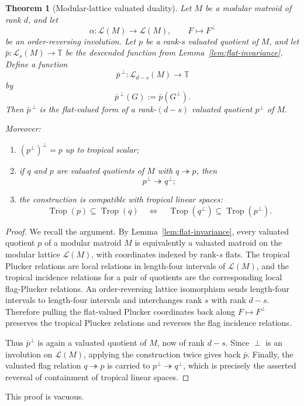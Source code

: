\documentclass[12pt]{article}
\newcommand{\Trop}{\operatorname{Trop}}
\newcommand{\cL}{\mathcal L}
\theoremstyle{plain}
\newtheorem{theorem}{Theorem}[section]
\theoremstyle{definition}
\newcommand{\review}[1]{\begin{reviewbox}#1\end{reviewbox}}
\begin{document}
\begin{theorem}[Modular-lattice valuated duality]\label{thm:modular-duality}
Let \(M\) be a modular matroid of rank \(d\), and let
\[
   \alpha:\cL(M)\longrightarrow \cL(M),\qquad F\longmapsto F^\perp
\]
be an order-reversing involution.  Let \(p\) be a rank-\(s\) valuated quotient of \(M\), and let \(\bar p:\cL_s(M)\to \mathbb T\) be the descended function from Lemma~\ref{lem:flat-invariance}.  Define a function
\[
   \bar p^{\,\perp}:\cL_{d-s}(M)\longrightarrow \mathbb T
\]
by
\[
   \bar p^{\,\perp}(G):=\bar p(G^\perp).
\]
Then \(\bar p^{\,\perp}\) is the flat-valued form of a rank-\((d-s)\) valuated quotient \(p^\perp\) of \(M\).

Moreover:
\begin{enumerate}[label=\textup{(\roman*)}]
\item \((p^\perp)^\perp=p\) up to tropical scalar;
\item if \(q\) and \(p\) are valuated quotients of \(M\) with \(q\twoheadrightarrow p\), then
\[
   p^\perp\twoheadrightarrow q^\perp;
\]
\item the construction is compatible with tropical linear spaces:
\[
   \Trop(p)\subseteq \Trop(q)
   \quad\Longleftrightarrow\quad
   \Trop(q^\perp)\subseteq \Trop(p^\perp).
\]
\end{enumerate}
\end{theorem}

\begin{proof}
We recall the argument.  By Lemma~\ref{lem:flat-invariance}, every valuated quotient \(p\) of a modular matroid \(M\) is equivalently a valuated matroid on the modular lattice \(\cL(M)\), with coordinates indexed by rank-\(s\) flats.  The tropical Plucker relations are local relations in length-four intervals of \(\cL(M)\), and the tropical incidence relations for a pair of quotients are the corresponding local flag-Plucker relations.  An order-reversing lattice isomorphism sends length-four intervals to length-four intervals and interchanges rank \(s\) with rank \(d-s\).  Therefore pulling the flat-valued Plucker coordinates back along \(F\mapsto F^\perp\) preserves the tropical Plucker relations and reverses the flag incidence relations.

Thus \(\bar p^\perp\) is again a valuated quotient of \(M\), now of rank \(d-s\).  Since \(\perp\) is an involution on \(\cL(M)\), applying the construction twice gives back \(\bar p\).  Finally, the valuated flag relation \(q\twoheadrightarrow p\) is carried to \(p^\perp\twoheadrightarrow q^\perp\), which is precisely the asserted reversal of containment of tropical linear spaces.
\end{proof}
\review{This proof is vacuous.}
\end{document}
